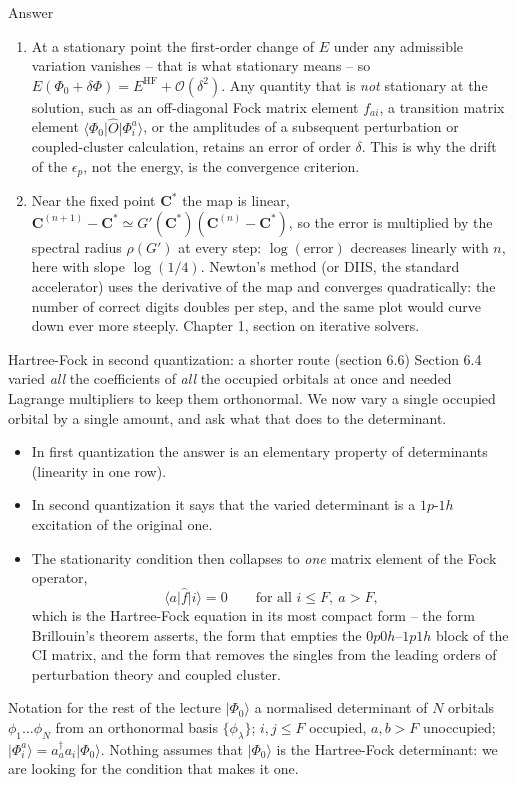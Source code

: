 \documentclass[aspectratio=169,10pt]{beamer}
\newcounter{thinkctr}
\newcommand{\thinka}[1]{%
  \begin{tcolorbox}[colback=paleteal,colframe=teal,title={\bfseries Answer to pause \#\thethinkctr}]
  #1
  \end{tcolorbox}}
\newcommand{\ket}[1]{\vert #1\rangle}
\newcommand{\element}[3]{\langle #1\vert #2\vert #3\rangle}
\newcommand{\bigO}{\mathcal{O}}
\begin{document}
\begin{frame}{Answer}
  \thinka{
  \begin{enumerate}
    \item At a stationary point the first-order change of $E$ under any admissible variation vanishes -- that is what stationary means -- so $E(\Phi_0+\delta\Phi)=E^{\mathrm{HF}}+\bigO(\delta^2)$. Any quantity that is \emph{not} stationary at the solution, such as an off-diagonal Fock matrix element $f_{ai}$, a transition matrix element $\element{\Phi_0}{\hat{O}}{\Phi_i^a}$, or the amplitudes of a subsequent perturbation or coupled-cluster calculation, retains an error of order $\delta$. This is why the drift of the $\epsilon_p$, not the energy, is the convergence criterion.
    \item Near the fixed point $\bm{C}^{*}$ the map is linear, $\bm{C}^{(n+1)}-\bm{C}^{*}\simeq G'(\bm{C}^{*})(\bm{C}^{(n)}-\bm{C}^{*})$, so the error is multiplied by the spectral radius $\rho(G')$ at every step: $\log(\mathrm{error})$ decreases linearly with $n$, here with slope $\log(1/4)$. Newton's method (or DIIS, the standard accelerator) uses the derivative of the map and converges quadratically: the number of correct digits doubles per step, and the same plot would curve down ever more steeply. Chapter 1, section on iterative solvers.
  \end{enumerate}}
\end{frame}

\begin{frame}{Hartree-Fock in second quantization: a shorter route (section 6.6)}
  \small
  Section 6.4 varied \emph{all} the coefficients of \emph{all} the occupied orbitals at once and needed Lagrange multipliers to keep them orthonormal. We now vary a \alert{single} occupied orbital by a \alert{single} amount, and ask what that does to the determinant.
  \begin{itemize}
    \item In first quantization the answer is an elementary property of determinants (linearity in one row).
    \item In second quantization it says that the varied determinant is a $1p$-$1h$ excitation of the original one.
    \item The stationarity condition then collapses to \emph{one} matrix element of the Fock operator,
    \[
      \element{a}{\hat{f}}{i}=0\qquad\text{for all }i\le F,\ a>F,
    \]
    which is the Hartree-Fock equation in its most compact form -- the form Brillouin's theorem asserts, the form that empties the $0p0h$--$1p1h$ block of the CI matrix, and the form that removes the singles from the leading orders of perturbation theory and coupled cluster.
  \end{itemize}
  \begin{block}{Notation for the rest of the lecture}
    $\ket{\Phi_0}$ a normalised determinant of $N$ orbitals $\phi_1\dots\phi_N$ from an orthonormal basis $\{\phi_\lambda\}$; $i,j\le F$ occupied, $a,b>F$ unoccupied; $\ket{\Phi_i^a}=a_a^{\dagger}a_i\ket{\Phi_0}$. Nothing assumes that $\ket{\Phi_0}$ is the Hartree-Fock determinant: we are looking for the condition that makes it one.
  \end{block}
\end{frame}
\end{document}

